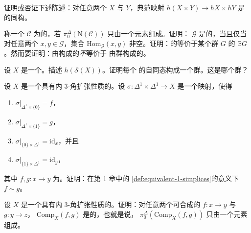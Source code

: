 \begin{exercise}\label{ex:h-not-monoidal}
证明或否证下述陈述：对任意两个\trSimplicialSet{} $X$ 与 $Y$，典范映射
$h(X \times Y) \to hX \times hY$ 是\trCategory{}的同构。
\end{exercise}

\begin{exercise}\label{ex:connected-groupoids}
称一个\trCategory{} $\mathcal{C}$ 为\trConnected{}的，若
$\pi^{\Delta}_0(\mathrm{N}(\mathcal{C}))$ 只由一个元素组成。证明：\trGroupoid{}%
$\mathcal{G}$ 是\trConnected{}的，当且仅当对任意两个\trObject{} $x, y \in \mathcal{G}$，集合
$\mathrm{Hom}_{\mathcal{G}}(x, y)$ 非空。证明：\trConnected{}的\trGroupoid{}等价于某个群 $G$
的 $\mathbb{B}G$。然而要证明：由\trConnected{}\trGroupoid{}构成的\trCategory{}\emph{不}等价于
由群构成的\trCategory{}。
\end{exercise}

\begin{exercise}\label{ex:h-singular-category}
设 $X$ 是一个\trTopologicalSpace{}。描述\trCategory{} $h(\mathcal{S}(X))$。证明每个%
\trObject{}的自同态构成一个群。这是哪个群？
\end{exercise}

\begin{exercise}\label{ex:homotopic-square-composer}
设 $X$ 是一个具有内 $3$-角扩张性质的\trComposer{}。设
$\sigma\colon \Delta^1 \times \Delta^1 \to X$ 是一个映射，使得
\begin{enumerate}[label=(\arabic*)]
  \item $\sigma|_{\Delta^1 \times \{0\}} = f$，
  \item $\sigma|_{\Delta^1 \times \{1\}} = g$，
  \item $\sigma|_{\{0\} \times \Delta^1} = \mathrm{id}_x$，并且
  \item $\sigma|_{\{1\} \times \Delta^1} = \mathrm{id}_y$，
\end{enumerate}
其中 $f, g\colon x \to y$ 为\trMorphism{}。证明：在第 1 章中的%
\cref{def:equivalent-1-simplices}的意义下 $f \sim g$。
\end{exercise}

\begin{exercise}\label{ex:composition-space-connected}
设 $X$ 是一个具有内 $3$-角扩张性质的\trComposer{}。证明：对任意两个可合成的%
\trMorphism{} $f\colon x \to y$ 与 $g\colon y \to z$，\trSimplicialSet{}%
$\mathrm{Comp}_X(f, g)$ 是\trConnected{}的，也就是说，
$\pi^{\Delta}_0(\mathrm{Comp}_X(f, g))$ 只由一个元素组成。
\end{exercise}

